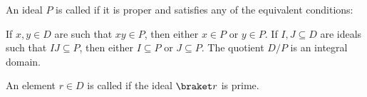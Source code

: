 \begin{definition}\label{def:prime_ring_ideal}
  An ideal \( P \) is called  if it is proper and satisfies any of the equivalent conditions:
  \begin{thmenum}
     If \( x, y \in D \) are such that \( xy \in P \), then either \( x \in P \) or \( y \in P \).
     If \( I, J \subseteq D \) are ideals such that \( IJ \subseteq P \), then either \( I \subseteq P \) or \( J \subseteq P \).
     The quotient \( D / P \) is an integral domain.
  \end{thmenum}

  An element \( r \in D \) is called  if the ideal \( \braket r \) is prime.
\end{definition}
